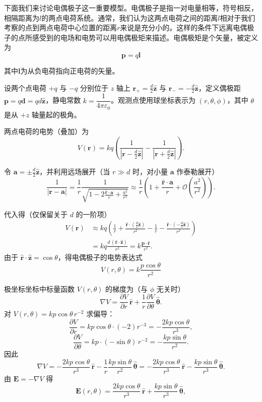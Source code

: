 \documentclass[12pt,a4paper,oneside]{report}
\theoremstyle{definition}
\theoremstyle{remark}
\begin{document}
下面我们来讨论电偶极子这一重要模型。电偶极子是指一对电量相等，符号相反，相隔距离为$l$的两点电荷系统。通常，我们认为这两点电荷之间的距离$l$相对于我们考察的点到两点电荷中心位置的距离$r$来说是充分小的。这样的条件下远离电偶极子的点所感受到的电场和电势可以用电偶极矩来描述。电偶极矩是个矢量，被定义为
\[
\mathbf{p} = q \mathbf{l}
\]

其中$\mathbf{l}$为从负电荷指向正电荷的矢量。

设两个点电荷 $+q$ 与 $-q$ 分别位于 $z$ 轴上 $\mathbf{r}_+=\frac{d}{2}\hat{\mathbf{z}}$ 与 $\mathbf{r}_-=-\frac{d}{2}\hat{\mathbf{z}}$，定义偶极距 $\mathbf{p}=q\mathbf{d}=q d\hat{\mathbf{z}}$，静电常数 $k=\dfrac{1}{4\pi\varepsilon_0}$。观测点使用球坐标表示为 $(r,\theta,\phi)$，其中 $\theta$ 是从 $+z$ 轴量起的极角。

两点电荷的电势（叠加）为
\[
V(\mathbf{r})=kq\left(\frac{1}{|\mathbf{r}-\frac{d}{2}\hat{\mathbf{z}}|}
-\frac{1}{|\mathbf{r}+\frac{d}{2}\hat{\mathbf{z}}|}\right).
\]

令 $\mathbf{a}=\pm\frac{d}{2}\hat{\mathbf{z}}$，并利用远场展开（当 $r\gg d$ 时，对小量 $\mathbf{a}$ 作泰勒展开）
\[
\frac{1}{|\mathbf{r}-\mathbf{a}|}
=\frac{1}{r}\frac{1}{\sqrt{1-2\frac{\hat{\mathbf{r}}\cdot\mathbf{a}}{r}+\frac{a^2}{r^2}}}
\approx \frac{1}{r}\left(1+\frac{\hat{\mathbf{r}}\cdot\mathbf{a}}{r}+\mathcal{O}\!\left(\frac{a^2}{r^2}\right)\right).
\]

代入得（仅保留关于 $d$ 的一阶项）
\[
\begin{aligned}
V(\mathbf{r})
&\approx kq\left(\frac{1}{r}+\frac{\hat{\mathbf{r}}\cdot(\tfrac{d}{2}\hat{\mathbf{z}})}{r^2}
-\frac{1}{r}-\frac{\hat{\mathbf{r}}\cdot(-\tfrac{d}{2}\hat{\mathbf{z}})}{r^2}\right) \\
&= kq\frac{d\,(\hat{\mathbf{r}}\cdot\hat{\mathbf{z}})}{r^2}
= k\frac{\mathbf{p}\cdot\hat{\mathbf{r}}}{r^2}.
\end{aligned}
\]
由于 $\hat{\mathbf{r}}\cdot\hat{\mathbf{z}}=\cos\theta$，得电偶极子的电势表达式
\[
\,V(r,\theta)=k\frac{p\cos\theta}{r^{2}}\,
\]

极坐标坐标中标量函数 $V(r,\theta)$ 的梯度为（与 $\phi$ 无关时）
\[
\nabla V = \frac{\partial V}{\partial r}\,\hat{\mathbf{r}}
+ \frac{1}{r}\frac{\partial V}{\partial \theta}\,\hat{\boldsymbol{\theta}}.
\]
对 $V(r,\theta)=k p\cos\theta\,r^{-2}$ 求偏导：
\[
\frac{\partial V}{\partial r}
= k p\cos\theta\cdot(-2)r^{-3} = -\frac{2k p\cos\theta}{r^{3}},
\]
\[
\frac{\partial V}{\partial \theta}
= k p\cdot(-\sin\theta)\,r^{-2} = -\frac{k p\sin\theta}{r^{2}}.
\]
因此
\[
\nabla V = -\frac{2k p\cos\theta}{r^{3}}\,\hat{\mathbf{r}}
- \frac{1}{r}\frac{k p\sin\theta}{r^{2}}\,\hat{\boldsymbol{\theta}}
= -\frac{2k p\cos\theta}{r^{3}}\,\hat{\mathbf{r}}
- \frac{k p\sin\theta}{r^{3}}\,\hat{\boldsymbol{\theta}}.
\]
由 $\mathbf{E}=-\nabla V$ 得
\[
\mathbf{E}(r,\theta)=\frac{2k p\cos\theta}{r^{3}}\,\hat{\mathbf{r}}
+ \frac{k p\sin\theta}{r^{3}}\,\hat{\boldsymbol{\theta}},
\]
\end{document}
